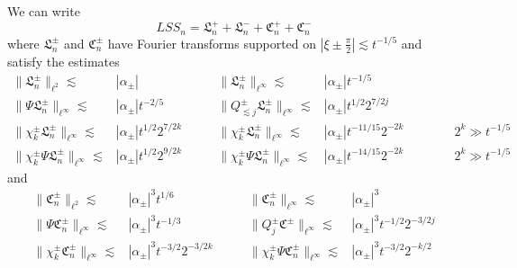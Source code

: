 \documentclass[10pt,a4paper]{amsart}
\newcommand{\fC}{\mathfrak{C}}
\newcommand{\fL}{\mathfrak{L}}
\newcommand{\fhPi}{\frac{\pi}{2}}
\newcommand{\mSS}{\mathit{SS}}
\begin{document}
\begin{lemma}\label{lem:LSS-expression}
    We can write
    \begin{equation*}
        L \mSS_n = \fL_n^+ + \fL_n^- + \fC_n^+ + \fC_n^-
    \end{equation*}
    where $\fL_n^\pm$ and $\fC_n^\pm$ have Fourier transforms supported on $|\xi \pm \fhPi| \lesssim t^{-1/5}$ and satisfy the estimates
    \begin{equation}\label{eqn:fL-ests}\begin{aligned}
        \lVert \fL_n^\pm \rVert_{\ell^2} \lesssim& |\alpha_\pm| &\qquad
        \lVert \fL_n^\pm \rVert_{\ell^\infty} \lesssim& |\alpha_\pm| t^{-1/5}\\
        \lVert \Psi \fL_n^\pm \rVert_{\ell^\infty} \lesssim& |\alpha_\pm| t^{-2/5}&\qquad
        \lVert Q_{\lesssim j}^\pm \fL_n^\pm \rVert_{\ell^\infty} \lesssim& |\alpha_\pm| t^{1/2} 2^{7/2j}\\
        \lVert \chi_{k}^\pm \fL_n^\pm \rVert_{\ell^\infty} \lesssim& |\alpha_\pm| t^{1/2} 2^{7/2k}&\qquad
        \lVert \chi^\pm_{k} \fL^\pm_n \rVert_{\ell^\infty} \lesssim& |\alpha_\pm| t^{-11/15}2^{-2k}               
        \qquad\qquad 2^k \gg t^{-1/5}\\
        \lVert \chi_{k}^\pm \Psi \fL_n^\pm \rVert_{\ell^\infty} \lesssim& |\alpha_\pm| t^{1/2} 2^{9/2k} &\qquad
        \lVert \chi_{k}^\pm \Psi \fL^\pm_n \rVert_{\ell^\infty} \lesssim& |\alpha_\pm| t^{-14/15} 2^{-2k}	   \qquad\qquad 2^k \gg t^{-1/5}
    \end{aligned}\end{equation}
    and
    \begin{equation}\label{eqn:fC-ests}\begin{aligned}
        \lVert \fC^\pm_n \rVert_{\ell^2} \lesssim& |\alpha_\pm|^3 t^{1/6}&\qquad
        \lVert \fC^\pm_n \rVert_{\ell^\infty} \lesssim& |\alpha_\pm|^3\\
        \lVert \Psi \fC^\pm_n \rVert_{\ell^\infty} \lesssim& |\alpha_\pm|^3t^{-1/3}&\qquad
        \lVert Q_j^\pm \fC^\pm \rVert_{\ell^\infty} \lesssim& |\alpha_\pm|^3 t^{-1/2} 2^{-3/2j}\\
        \lVert \chi_{k}^\pm \fC^\pm_n \rVert_{\ell^\infty} \lesssim& |\alpha_\pm|^3 t^{-3/2} 2^{-3/2 k}&\qquad
        \lVert \chi_{k}^\pm \Psi \fC^\pm_n \rVert_{\ell^\infty} \lesssim& |\alpha_\pm|^3 t^{-3/2} 2^{-k/2}
    \end{aligned}\end{equation}
\end{lemma}
\end{document}
